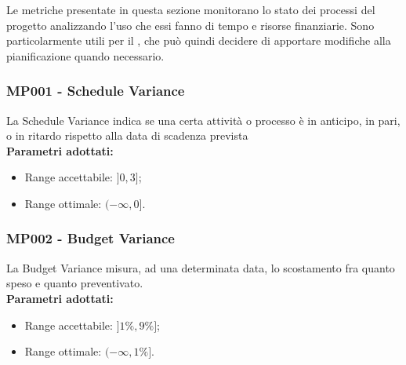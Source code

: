 Le metriche presentate in questa sezione monitorano lo stato dei processi del progetto analizzando l'uso che essi fanno di tempo e risorse finanziarie. Sono particolarmente utili per il \Res , che può quindi decidere di apportare modifiche alla pianificazione quando necessario.

\subsubsection{MP001 - Schedule Variance}\mbox{}
La Schedule Variance indica se una certa attività o processo è in anticipo, in pari, o in ritardo rispetto alla data di scadenza prevista\\[0,2cm]
\textbf{Parametri adottati:}
\begin{itemize}
	\item Range accettabile: $ ]0 , 3]$;
	\item Range ottimale: $(-\infty , 0]$.
\end{itemize}

\subsubsection{MP002 - Budget Variance}\mbox{}
La Budget Variance misura, ad una determinata data, lo scostamento fra quanto speso e quanto preventivato. \\[0,2cm]
\textbf{Parametri adottati:}
\begin{itemize}
	\item Range accettabile: $]1\% , 9\%]$;
	\item Range ottimale: $(-\infty , 1\%]$.
\end{itemize}